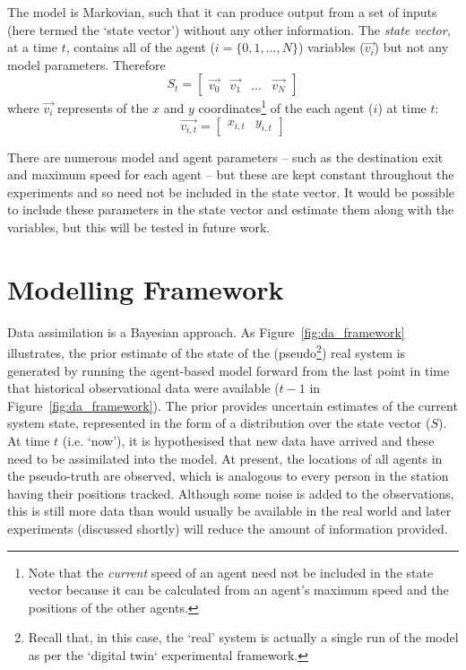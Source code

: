 \documentclass[runningheads]{llncs}
\begin{document}
The model is Markovian, such that it can produce  output from a set of inputs (here termed the `state vector') without any other information. The \textit{state vector}, at a time $t$, contains all of the agent ($i = \{ 0, 1, \dots, N \} $) variables ($\overrightarrow{v_i}$) but not any model parameters. Therefore 
\begin{equation}
S_t  = \left[ \begin{array}{cccc}
\overrightarrow{v_0} &  \overrightarrow{v_1} &  \dots & \overrightarrow{v_N} 
\end{array} \right]
\end{equation} 
where $\overrightarrow{v_i}$ represents of the $x$ and $y$ coordinates\footnote{Note that the \textit{current} speed of an  agent need not be included in the state vector because it can be calculated from an agent's maximum speed and the positions of the other agents.} of the each agent ($i$) at time $t$:
\begin{equation}
\overrightarrow{v_{i,t}}  = \left[ \begin{array}{cc} x_{i,t} & y_{i,t} \end{array}  \right]
\end{equation}

There are numerous model and agent parameters -- such as the destination exit and maximum speed for each agent -- but these are kept constant throughout the experiments and so need not be included in the state vector. It would be possible to include these parameters in the state vector and estimate them along with the variables, but this will be tested in future work.

%
%
%
%
\section{Modelling Framework}

Data assimilation is a Bayesian approach. As Figure~\ref{fig:da_framework} illustrates, the prior estimate of the state of the (pseudo\footnote{Recall that, in this case, the `real' system is actually a single run of the model as per the `digital twin` experimental framework.}) real system is generated by running the agent-based model forward from the last point in time that historical observational data were available ($t-1$ in Figure~\ref{fig:da_framework}). The prior provides uncertain estimates of the current system state, represented in the form of a distribution over the state vector ($S$). At time $t$ (i.e. `now'), it is hypothesised that new data have arrived and these need to be assimilated into the model. At present, the locations of all agents in the pseudo-truth are observed, which is analogous to every person in the station having their positions tracked. Although some noise is added to the observations, this is still more data than would usually be available in the real world and later experiments (discussed shortly) will reduce the amount of information provided. 
\end{document}
